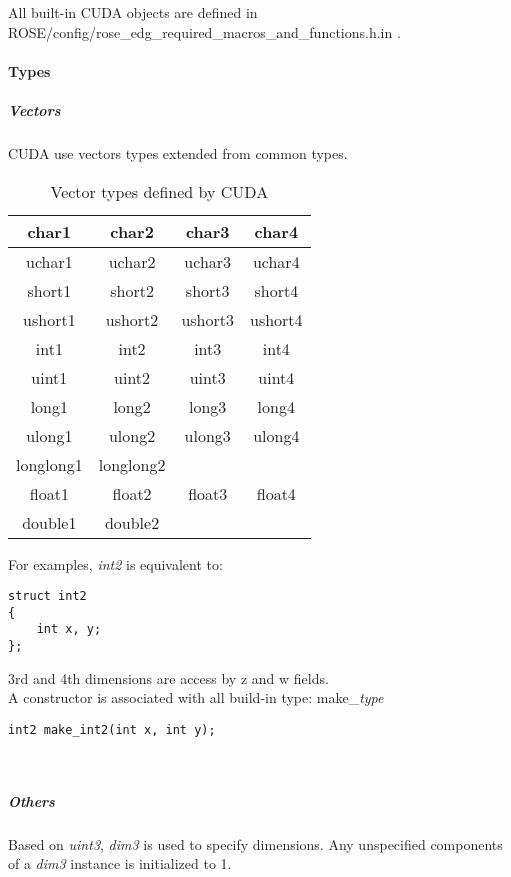 All built-in CUDA objects are defined in ROSE/config/rose\_edg\_required\_macros\_and\_functions.h.in .
			
				\paragraph{Types}
			
					\subparagraph{Vectors}
					
CUDA use vectors types extended from common types.
\begin{table}[!h]
	\caption{Vector types defined by CUDA}
	\center
	\begin{tabular}{|c|c|c|c|} \hline
	char1 & char2 & char3 & char4 \\\hline
	uchar1 & uchar2 & uchar3 & uchar4 \\\hline
	short1 & short2 & short3 & short4 \\\hline
	ushort1 & ushort2 & ushort3 & ushort4 \\\hline
	int1 & int2 & int3 & int4 \\\hline
	uint1 & uint2 & uint3 & uint4 \\\hline
	long1 & long2 & long3 & long4 \\\hline
	ulong1 & ulong2 & ulong3 & ulong4 \\\hline
	longlong1 & longlong2 &  & \\\hline
	float1 & float2 & float3 & float4 \\\hline
	double1 & double2 &  & \\\hline
	\end{tabular}
	\label{heterogeneous:tabCudaVector}
\end{table}

For examples, \emph{int2} is equivalent to:
\begin{verbatim}struct int2
{
	int x, y;
};\end{verbatim}
3rd and 4th dimensions are access by z and w fields.\\

A constructor is associated with all build-in type: make\_\emph{type}
\begin{verbatim}int2 make_int2(int x, int y);\end{verbatim}\\
			
					\subparagraph{Others}

Based on \emph{uint3}, \emph{dim3} is used to specify dimensions. Any unspecified components of a \emph{dim3} instance is initialized to 1.\\

